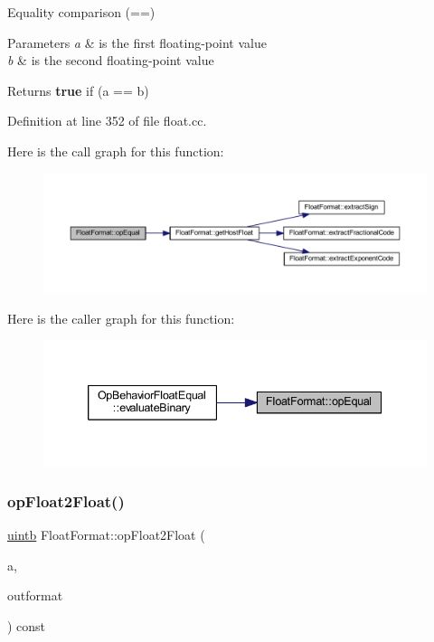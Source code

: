 Equality comparison (==) 


\begin{DoxyParams}{Parameters}
{\em a} & is the first floating-\/point value \\
\hline
{\em b} & is the second floating-\/point value \\
\hline
\end{DoxyParams}
\begin{DoxyReturn}{Returns}
{\bfseries{true}} if (a == b) 
\end{DoxyReturn}


Definition at line 352 of file float.\+cc.

Here is the call graph for this function\+:
\nopagebreak
\begin{figure}[H]
\begin{center}
\leavevmode
\includegraphics[width=350pt]{class_float_format_a1c59c49b0bdbc8d31d2df59eb0624d06_cgraph}
\end{center}
\end{figure}
Here is the caller graph for this function\+:
\nopagebreak
\begin{figure}[H]
\begin{center}
\leavevmode
\includegraphics[width=339pt]{class_float_format_a1c59c49b0bdbc8d31d2df59eb0624d06_icgraph}
\end{center}
\end{figure}
\mbox{\label{class_float_format_a4adac47dcb6d1ddbcf9c5f6980528fd2}} 
\subsubsection{\texorpdfstring{opFloat2Float()}{opFloat2Float()}}
{\footnotesize\ttfamily \mbox{\hyperlink{types_8h_a2db313c5d32a12b01d26ac9b3bca178f}{uintb}} Float\+Format\+::op\+Float2\+Float (\begin{DoxyParamCaption}\item[{\mbox{\hyperlink{types_8h_a2db313c5d32a12b01d26ac9b3bca178f}{uintb}}}]{a,  }\item[{const \mbox{\hyperlink{class_float_format}{Float\+Format}} \&}]{outformat }\end{DoxyParamCaption}) const}



